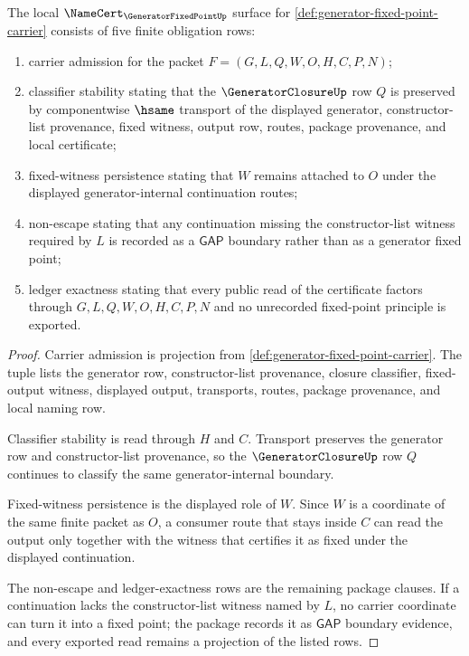 \begin{theorem}
\label{thm:generator-fixed-point-namecert-obligations}
The local $\NameCert_{\GeneratorFixedPointUp}$ surface for \autoref{def:generator-fixed-point-carrier} consists of five finite obligation rows:
\begin{enumerate}
\item carrier admission for the packet $F=(G,L,Q,W,O,H,C,P,N)$;
\item classifier stability stating that the $\GeneratorClosureUp$ row $Q$ is preserved by componentwise $\hsame$ transport of the displayed generator, constructor-list provenance, fixed witness, output row, routes, package provenance, and local certificate;
\item fixed-witness persistence stating that $W$ remains attached to $O$ under the displayed generator-internal continuation routes;
\item non-escape stating that any continuation missing the constructor-list witness required by $L$ is recorded as a $\mathsf{GAP}$ boundary rather than as a generator fixed point;
\item ledger exactness stating that every public read of the certificate factors through $G,L,Q,W,O,H,C,P,N$ and no unrecorded fixed-point principle is exported.
\end{enumerate}
\end{theorem}
\begin{proof}
Carrier admission is projection from \autoref{def:generator-fixed-point-carrier}. The tuple lists the generator row, constructor-list provenance, closure classifier, fixed-output witness, displayed output, transports, routes, package provenance, and local naming row.

Classifier stability is read through $H$ and $C$. Transport preserves the generator row and constructor-list provenance, so the $\GeneratorClosureUp$ row $Q$ continues to classify the same generator-internal boundary.

Fixed-witness persistence is the displayed role of $W$. Since $W$ is a coordinate of the same finite packet as $O$, a consumer route that stays inside $C$ can read the output only together with the witness that certifies it as fixed under the displayed continuation.

The non-escape and ledger-exactness rows are the remaining package clauses. If a continuation lacks the constructor-list witness named by $L$, no carrier coordinate can turn it into a fixed point; the package records it as $\mathsf{GAP}$ boundary evidence, and every exported read remains a projection of the listed rows.
\end{proof}


